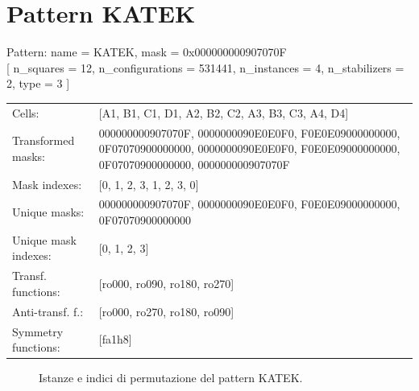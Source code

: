 \newpage

\section{Pattern KATEK}

\begin{tcolorbox}[sharp corners, fontupper=\ttfamily\small, colback=white]
  \noindent Pattern: name = KATEK, mask = 0x000000000907070F\\
  {[} n\_squares = 12, n\_configurations = 531441,
  n\_instances = 4, n\_stabilizers = 2, type = 3 { ]}\\[1.0ex]
  \begin{tabularx}{\textwidth}{@{} p{3.5cm} X @{}}
    Cells:               & {[}A1, B1, C1, D1, A2, B2, C2, A3, B3, C3, A4, D4{]}\\[0.5ex]
    Transformed masks:   & 000000000907070F, 0000000090E0E0F0, F0E0E09000000000, 0F07070900000000, 0000000090E0E0F0, F0E0E09000000000, 0F07070900000000, 000000000907070F\\[0.5ex]
    Mask indexes:        & {[}0, 1, 2, 3, 1, 2, 3, 0{]}\\[0.5ex]
    Unique masks:        & 000000000907070F, 0000000090E0E0F0, F0E0E09000000000, 0F07070900000000\\[0.5ex]
    Unique mask indexes: & {[}0, 1, 2, 3{]}\\[0.5ex]
    Transf. functions:   & {[}ro000, ro090, ro180, ro270{]}\\[0.5ex]
    Anti-transf. f.:     & {[}ro000, ro270, ro180, ro090{]}\\[0.5ex]
    Symmetry functions:  & {[}fa1h8{]}\\[0.5ex]
  \end{tabularx}
\end{tcolorbox}

\begin{figure}[htbp]
  \centering
   \hfill
   \hfill
   \hfill
  \vspace{0.3cm}
   \hfill
   \hfill
   \hfill
  \caption{Istanze e indici di permutazione del pattern KATEK.}
\end{figure}

